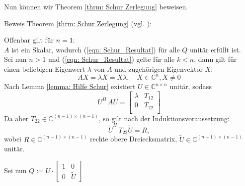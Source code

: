 \documentclass[a4paper,12pt]{report}
\newcommand{\C}{\mathbb C}
\newcommand{\1}{\mathds{1}}
\theoremstyle{plain} %
\theoremstyle{definition} %
\theoremstyle{remark}
\begin{document}
            Nun können wir Theorem \ref{thrm: Schur Zerlegung} beweisen.

            Beweis Theorem \ref{thrm: Schur Zerlegung} (vgl. \cite[S. 313]{matrixGolub}):

            Offenbar gilt für $n=1$:\\
            $A$ ist ein Skalar, wodurch (\ref{eqn: Schur_Resultat}) für alle $Q$ unitär erfüllt ist.\\
            Sei nun $n>1$ und (\ref{eqn: Schur_Resultat}) gelte für alle $k<n$, dann gilt für einen beliebigen Eigenwert $\lambda$ von $A$ und zugehörigen Eigenvektor $X$:
            $$AX = \lambda X = X \lambda,\quad X\in \C^n, X\ne 0$$
            Nach Lemma \ref{lemma: Hilfe Schur} existiert $U\in \C^{n\times n}$ unitär, sodass
            $$U^H\, AU = \begin{bmatrix}
                  \lambda & T_{12} \\
                  0 & T_{22} \\
                  \end{bmatrix}$$
            Da aber $T_{22}\in\C^{(n-1)\times(n-1)}$, so gilt nach der Induktionsvoraussetzung:
            $$\widetilde U^H\,T_{22}\widetilde U = R,$$
            wobei $R\in\C^{(n-1)\times(n-1)}$  rechte obere Dreiecksmatrix, $\widetilde U \in\C^{(n-1)\times(n-1)}$ unitär.

            Sei nun $Q:=U\cdot\begin{bmatrix}
                  1&0\\
                  0&\widetilde U
            \end{bmatrix}$
\end{document}
